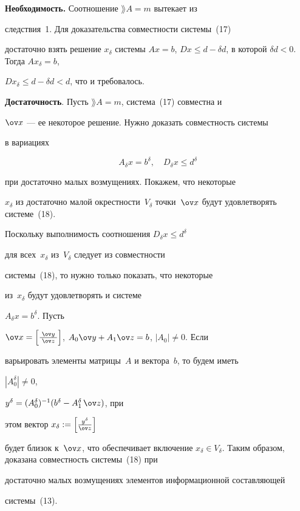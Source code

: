 \begin{pf} {\bf Необходимость.} Соотношение $\rang A=m$ вытекает из


следствия~1. Для доказательства совместности системы~(17)


достаточно взять решение $x_{\delta}$ системы $Ax=b$, $Dx\leq


d-\delta d$, в которой $\delta d<0$. Тогда $Ax_{\delta}=b$,


$Dx_{\delta}\leq d-\delta d<d$, что и требовалось.





{\bf Достаточность}. Пусть $\rang A=m$, система~(17) совместна и


$\ov x$ --- ее некоторое решение. Нужно доказать совместность системы


в вариациях


\begin{equation}


A_{\delta}x=b^{\delta},\quad D_{\delta}x\leq d^{\delta}


\end{equation}


при достаточно малых возмущениях. Покажем, что некоторые


$x_{\delta}$ из достаточно малой окрестности~$V_{\delta}$ точки~$\ov


x$ будут удовлетворять системе~(18).


Поскольку выполнимость соотношения $D_{\delta}x\leq d^{\delta}$


для всех~$x_{\delta}$ из~$V_{\delta}$ следует из совместности


системы~(18), то нужно только показать, что некоторые


из~$x_{\delta}$ будут удовлетворять и системе


$A_{\delta}x=b^{\delta}$. Пусть


$\ov x=\left[\frac{\phantom{.}\ov y\phantom{.}}{\ov


z}\right]$, $A_0\ov y+A_1\ov z=b$, $|A_0|\neq 0$. Если


варьировать элементы матрицы~$A$ и вектора~$b$, то будем иметь


$|A_0^{\delta}|\neq 0$,


$y^{\delta}=(A_0^{\delta})^{-1}(b^{\delta}-A_1^{\delta}\,\ov z)$, при


этом вектор $x_{\delta}:= \left[\frac{ y^{\delta}}{\ov z}\right]$


будет близок к~$\ov x$, что обеспечивает включение $x_{\delta}\in


V_{\delta}$. Таким образом, доказана совместность системы~(18) при


достаточно малых возмущениях элементов информационной составляющей


системы~(13).


\end{pf}





